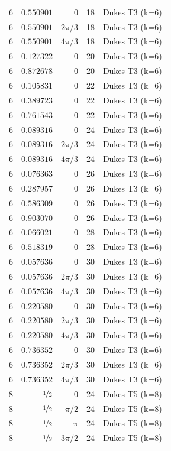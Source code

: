\documentclass[aps,pra,reprint,amsmath,amssymb,superscriptaddress,floatfix]{revtex4-2}
\begin{document}
\begin{longtable}{rrrrc}
6 & $0.550901$ & $0$ & 18 & Dukes T3 (k=6) \\
6 & $0.550901$ & $2\pi/3$ & 18 & Dukes T3 (k=6) \\
6 & $0.550901$ & $4\pi/3$ & 18 & Dukes T3 (k=6) \\
6 & $0.127322$ & $0$ & 20 & Dukes T3 (k=6) \\
6 & $0.872678$ & $0$ & 20 & Dukes T3 (k=6) \\
6 & $0.105831$ & $0$ & 22 & Dukes T3 (k=6) \\
6 & $0.389723$ & $0$ & 22 & Dukes T3 (k=6) \\
6 & $0.761543$ & $0$ & 22 & Dukes T3 (k=6) \\
6 & $0.089316$ & $0$ & 24 & Dukes T3 (k=6) \\
6 & $0.089316$ & $2\pi/3$ & 24 & Dukes T3 (k=6) \\
6 & $0.089316$ & $4\pi/3$ & 24 & Dukes T3 (k=6) \\
6 & $0.076363$ & $0$ & 26 & Dukes T3 (k=6) \\
6 & $0.287957$ & $0$ & 26 & Dukes T3 (k=6) \\
6 & $0.586309$ & $0$ & 26 & Dukes T3 (k=6) \\
6 & $0.903070$ & $0$ & 26 & Dukes T3 (k=6) \\
6 & $0.066021$ & $0$ & 28 & Dukes T3 (k=6) \\
6 & $0.518319$ & $0$ & 28 & Dukes T3 (k=6) \\
6 & $0.057636$ & $0$ & 30 & Dukes T3 (k=6) \\
6 & $0.057636$ & $2\pi/3$ & 30 & Dukes T3 (k=6) \\
6 & $0.057636$ & $4\pi/3$ & 30 & Dukes T3 (k=6) \\
6 & $0.220580$ & $0$ & 30 & Dukes T3 (k=6) \\
6 & $0.220580$ & $2\pi/3$ & 30 & Dukes T3 (k=6) \\
6 & $0.220580$ & $4\pi/3$ & 30 & Dukes T3 (k=6) \\
6 & $0.736352$ & $0$ & 30 & Dukes T3 (k=6) \\
6 & $0.736352$ & $2\pi/3$ & 30 & Dukes T3 (k=6) \\
6 & $0.736352$ & $4\pi/3$ & 30 & Dukes T3 (k=6) \\
8 & $\nicefrac{1}{2}$ & $0$ & 24 & Dukes T5 (k=8) \\
8 & $\nicefrac{1}{2}$ & $\pi/2$ & 24 & Dukes T5 (k=8) \\
8 & $\nicefrac{1}{2}$ & $\pi$ & 24 & Dukes T5 (k=8) \\
8 & $\nicefrac{1}{2}$ & $3\pi/2$ & 24 & Dukes T5 (k=8) \\
\end{longtable}



\end{document}
